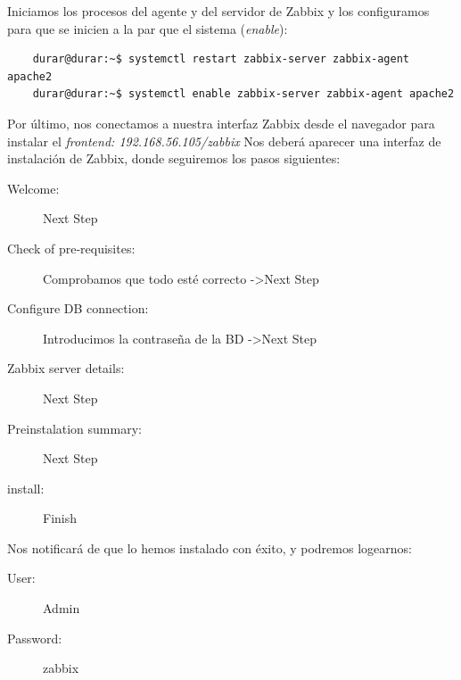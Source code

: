 \documentclass[a4paper]{article}
\begin{document}
Iniciamos los procesos del agente y del servidor de Zabbix y los configuramos
 para que se inicien a la par que el sistema (\textsl{enable}):\newpage
\begin{lstlisting}
    durar@durar:~$ systemctl restart zabbix-server zabbix-agent apache2
    durar@durar:~$ systemctl enable zabbix-server zabbix-agent apache2
\end{lstlisting}
Por último, nos conectamos a nuestra interfaz Zabbix desde el navegador para
instalar el \textsl{frontend: 192.168.56.105/zabbix} \newline
Nos deberá aparecer una interfaz de instalación de Zabbix, donde seguiremos los pasos siguientes:
\begin{description}
    \item[Welcome:] Next Step 
    \item[Check of pre-requisites:] Comprobamos que todo esté correcto -\textgreater Next Step
    \item[Configure DB connection:] Introducimos la contraseña de la BD -\textgreater Next Step   
    \item[Zabbix server details:] Next Step
    \item[Preinstalation summary:] Next Step
    \item[install:] Finish   
\end{description}
Nos notificará de que lo hemos instalado con éxito, y podremos logearnos:
\begin{description}
    \item[User:] Admin
    \item[Password:] zabbix  
\end{description}
\end{document}
